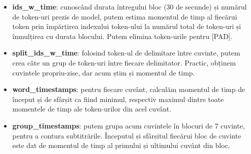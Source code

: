 \begin{itemize}
    \item \textbf{ids\_w\_time}: cunoscând durata întregului bloc (30 de secunde) și numărul de token-uri
    prezis de model, putem estima momentul de timp al fiecărui token prin împărțirea indexului token-ului
    la numărul total de token-uri și înmulțirea cu durata blocului. Putem elimina token-urile pentru [PAD].
    \item \textbf{split\_ids\_w\_time}: folosind token-ul de delimitare între cuvinte, putem crea câte un 
    grup de token-uri între fiecare delimitator. Practic, obținem cuvintele propriu-zise, dar acum știm și
    momentul de timp.
    \item \textbf{word\_timestamps}: pentru fiecare cuvânt, calculăm momentul de timp de început și de sfârșit
    ca fiind minimul, respectiv maximul dintre toate momentele de timp ale token-urilor din acel cuvânt.
    \item \textbf{group\_timestamps}: putem grupa acum cuvintele în blocuri de 7 cuvinte, pentru a contura
    subtitrările. Începutul și sfârșitul fiecărui bloc de cuvinte este dat de momentul de timp al primului
    și ultimului cuvânt din bloc.
\end{itemize}

